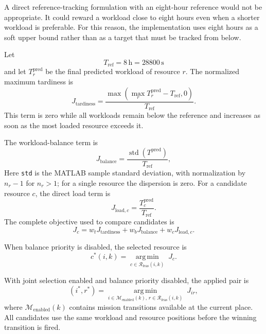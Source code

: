A direct reference-tracking formulation with an eight-hour reference would
not be appropriate. It could reward a workload close to eight hours even
when a shorter workload is preferable. For this reason, the implementation
uses eight hours as a soft upper bound rather than as a target that must be
tracked from below.

Let
\begin{equation}
	T_{\mathrm{ref}} = 8\,\mathrm{h} = 28800\,\mathrm{s}
\end{equation}
and let $T_r^{\mathrm{pred}}$ be the final predicted workload of resource
$r$. The normalized maximum tardiness is
\begin{equation}
	J_{\mathrm{tardiness}} =
	\frac{\max\left(\max_r T_r^{\mathrm{pred}}-T_{\mathrm{ref}},0\right)}
	{T_{\mathrm{ref}}}.
\end{equation}
This term is zero while all workloads remain below the reference and
increases as soon as the most loaded resource exceeds it.

The workload-balance term is
\begin{equation}
	J_{\mathrm{balance}} =
	\frac{\operatorname{std}(T^{\mathrm{pred}})}{T_{\mathrm{ref}}},
\end{equation}
Here \texttt{std} is the MATLAB sample standard deviation, with normalization
by $n_r-1$ for $n_r>1$; for a single resource the dispersion is zero.
For a candidate resource $c$, the direct load term is
\begin{equation}
	J_{\mathrm{load},c} =
	\frac{T_c^{\mathrm{pred}}}{T_{\mathrm{ref}}}.
\end{equation}
The complete objective used to compare candidates is
\begin{equation}
	J_c =
	w_t J_{\mathrm{tardiness}}
	+ w_b J_{\mathrm{balance}}
	+ w_c J_{\mathrm{load},c}.
\end{equation}

When balance priority is disabled, the selected resource is
\begin{equation}
	c^*(i,k) =
	\underset{c\in\mathcal{R}_{\mathrm{feas}}(i,k)}
	{\operatorname{arg\,min}}\;J_c.
\end{equation}

With joint selection enabled and balance priority disabled, the applied pair is
\begin{equation}
	(i^*,r^*) = \underset{i\in\mathcal{M}_{\mathrm{enabled}}(k),\,
		r\in\mathcal{R}_{\mathrm{feas}}(i,k)}{\operatorname{arg\,min}}\;J_{ir},
\end{equation}
where $\mathcal{M}_{\mathrm{enabled}}(k)$ contains mission transitions
available at the current place. All candidates use the same workload and
resource positions before the winning transition is fired.

